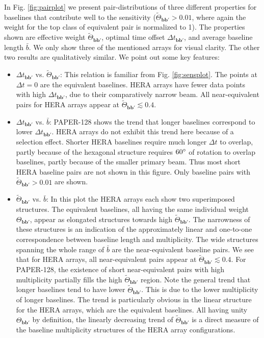 \documentclass[twocolumn,apj,numberedappendix]{emulateapj}
\renewcommand\[{\begin{equation}}
\renewcommand\]{\end{equation}}
\begin{document}
In Fig. \ref{fig:pairplot} we present pair-distributions of three different properties for baselines that contribute well to the sensitivity ($\widetilde{\Theta}_{\boldsymbol{bb'}}>0.01$, where again the weight for the top class of equivalent pair is normalized to 1). The properties shown are effective weight $\widetilde{\Theta}_{\boldsymbol{bb'}}$, optimal time offset $\Delta t_{\boldsymbol{bb'}}$, and average baseline length $\bar{b}$. We only show three of the mentioned arrays for visual clarity. The other two results are qualitatively similar. We point out some key features:
\begin{itemize}

\item $\Delta t_{\boldsymbol{bb'}}$ vs. $\widetilde{\Theta}_{\boldsymbol{bb'}}$:
This relation  is familiar from Fig. \ref{fig:sensplot}. The points at $\Delta t=0$ are the equivalent baselines. HERA arrays have fewer data points with high $\Delta t_{\boldsymbol{bb'}}$, due to their comparatively narrow beam. All near-equivalent pairs for HERA arrays appear at $\widetilde{\Theta}_{\boldsymbol{bb'}}\lesssim 0.4$.

\item $\Delta t_{\boldsymbol{bb'}}$ vs. $\bar{b}$:
PAPER-128 shows the trend that longer baselines correspond to lower $\Delta t_{\boldsymbol{bb'}}$. HERA arrays do not exhibit this trend here because of a selection effect. Shorter HERA baselines require much longer $\Delta t$ to overlap, partly because of the hexagonal structure requires $60\degree$ of rotation to overlap baselines, partly because of the smaller primary beam. Thus most short HERA baseline pairs are not shown in this figure. Only baseline pairs with $\widetilde{\Theta}_{\boldsymbol{bb'}}>0.01$ are shown.


\item $\widetilde{\Theta}_{\boldsymbol{bb'}}$ vs. $\bar{b}$:
In this plot the HERA arrays each show two superimposed structures.  The equivalent baselines, all having the same individual weight $\Theta_{\boldsymbol{bb'}}$, appear as elongated structures towards high $\widetilde{\Theta}_{\boldsymbol{bb'}}$. The narrowness of these structures is an indication of the approximately linear and one-to-one correspondence between baseline length and multiplicity. The wide structures spanning the whole range of $\bar{b}$ are the near-equivalent baseline pairs. We see that for HERA arrays, all near-equivalent pairs appear at $\widetilde{\Theta}_{\boldsymbol{bb'}}\lesssim 0.4$. For PAPER-128, the existence of short near-equivalent pairs with high multiplicity partially fills the high $\widetilde{\Theta}_{\boldsymbol{bb'}}$ region. 
Note the general trend that longer baselines tend to have lower $\widetilde{\Theta}_{\boldsymbol{bb'}}$. This is due to the lower multiplicity of longer baselines. The trend is particularly obvious in the linear structure for the HERA arrays, which are the equivalent baselines. All having unity $\Theta_{\boldsymbol{bb'}}$ by definition, the linearly decreasing trend of $\widetilde{\Theta}_{\boldsymbol{bb'}}$ is a direct measure of the baseline multiplicity structures of the HERA array configurations.


\end{itemize}
\end{document}
